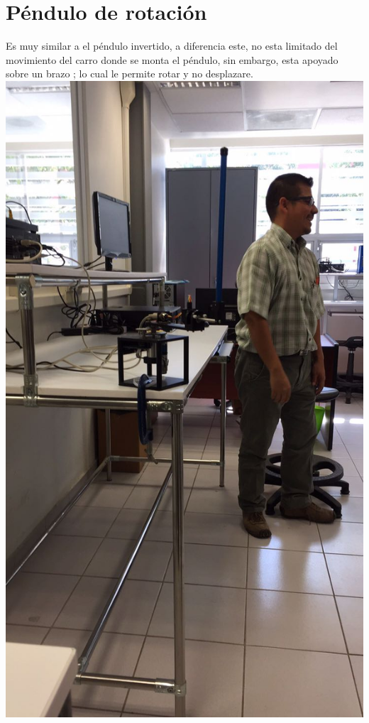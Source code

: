 \documentclass[12pt,a4paper]{book}
\begin{document}
\section{Péndulo de rotación}
Es muy similar a el péndulo invertido, a diferencia este, no esta limitado del movimiento del carro donde se monta el péndulo, sin embargo, esta apoyado sobre un brazo ; lo cual le permite rotar y no desplazare.
\\
\includegraphics[scale=.25]{./5.jpeg}
\end{document}
